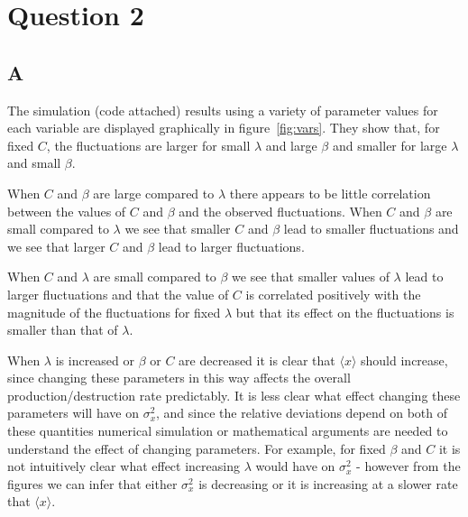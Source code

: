 \documentclass[a4paper,12pt]{article}
\begin{document}
\section*{Question 2}

\subsection*{A}
The simulation (code attached) results using a variety of parameter values for each variable are displayed graphically in figure~\ref{fig:vars}. They show that, for fixed $C$, the fluctuations are larger for small $\lambda$ and large $\beta$ and smaller for large $\lambda$ and small $\beta$. 

When $C$ and $\beta$ are large compared to $\lambda$ there appears to be little correlation between the values of $C$ and $\beta$ and the observed fluctuations. When $C$ and $\beta$ are small compared to $\lambda$ we see that smaller $C$ and $\beta$ lead to smaller fluctuations and we see that larger $C$ and $\beta$ lead to larger fluctuations.

When $C$ and $\lambda$ are small compared to $\beta$ we see that smaller values of $\lambda$ lead to larger fluctuations and that the value of $C$ is correlated positively with the magnitude of the fluctuations for fixed $\lambda$ but that its effect on the fluctuations is smaller than that of $\lambda$.

When $\lambda$ is increased or $\beta$ or $C$ are decreased it is clear that $\langle x \rangle$ should increase, since changing these parameters in this way affects the overall production/destruction rate predictably. It is less clear what effect changing these parameters will have on $\sigma^2_x$, and since the relative deviations depend on both of these quantities numerical simulation or mathematical arguments are needed to understand the effect of changing parameters. For example, for fixed $\beta$ and $C$ it is not intuitively clear what effect increasing $\lambda$ would have on $\sigma^2_x$ - however from the figures we can infer that either $\sigma^2_x$ is decreasing or it is increasing at a slower rate that $\langle x \rangle$.
\end{document}
